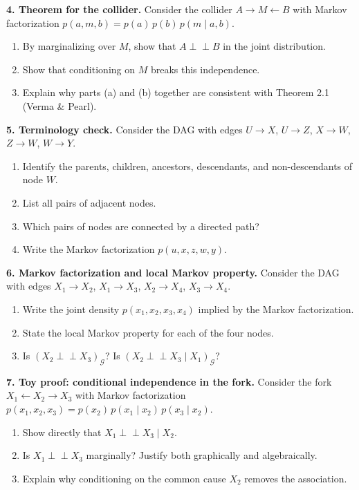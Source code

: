 \documentclass[
  a4paper,
]{book}
\providecommand{\tightlist}{%
  \setlength{\itemsep}{0pt}\setlength{\parskip}{0pt}}
\newcommand{\indep}{\perp\!\!\!\perp}
\newcommand{\Gcal}{\mathcal{G}}
\begin{document}
\textbf{4. Theorem for the collider.} Consider the collider
\(A \to M \leftarrow B\) with Markov factorization
\(p(a, m, b) = p(a)\,p(b)\,p(m \mid a, b)\).

\begin{enumerate}
\def\labelenumi{(\alph{enumi})}
\tightlist
\item
  By marginalizing over \(M\), show that \(A \indep B\) in the joint
  distribution.
\item
  Show that conditioning on \(M\) breaks this independence.
\item
  Explain why parts (a) and (b) together are consistent with Theorem 2.1
  (Verma \& Pearl).
\end{enumerate}

\textbf{5. Terminology check.} Consider the DAG with edges \(U \to X\),
\(U \to Z\), \(X \to W\), \(Z \to W\), \(W \to Y\).

\begin{enumerate}
\def\labelenumi{(\alph{enumi})}
\tightlist
\item
  Identify the parents, children, ancestors, descendants, and
  non-descendants of node \(W\).
\item
  List all pairs of adjacent nodes.
\item
  Which pairs of nodes are connected by a directed path?
\item
  Write the Markov factorization \(p(u, x, z, w, y)\).
\end{enumerate}

\textbf{6. Markov factorization and local Markov property.} Consider the
DAG with edges \(X_1 \to X_2\), \(X_1 \to X_3\), \(X_2 \to X_4\),
\(X_3 \to X_4\).

\begin{enumerate}
\def\labelenumi{(\alph{enumi})}
\tightlist
\item
  Write the joint density \(p(x_1, x_2, x_3, x_4)\) implied by the
  Markov factorization.
\item
  State the local Markov property for each of the four nodes.
\item
  Is \((X_2 \indep X_3)_{\Gcal}\)? Is
  \((X_2 \indep X_3 \mid X_1)_{\Gcal}\)?
\end{enumerate}

\textbf{7. Toy proof: conditional independence in the fork.} Consider
the fork \(X_1 \leftarrow X_2 \to X_3\) with Markov factorization
\(p(x_1, x_2, x_3) = p(x_2)\,p(x_1 \mid x_2)\,p(x_3 \mid x_2)\).

\begin{enumerate}
\def\labelenumi{(\alph{enumi})}
\tightlist
\item
  Show directly that \(X_1 \indep X_3 \mid X_2\).
\item
  Is \(X_1 \indep X_3\) marginally? Justify both graphically and
  algebraically.
\item
  Explain why conditioning on the common cause \(X_2\) removes the
  association.
\end{enumerate}
\end{document}
